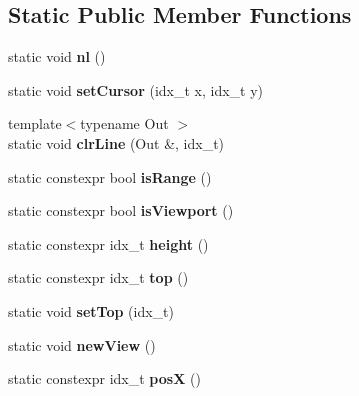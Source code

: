 \subsection*{Static Public Member Functions}
\begin{DoxyCompactItemize}
\item 
\mbox{\label{structVoid_ab9e55460d62efcdee74b1aa4d9f072d8}} 
static void {\bfseries nl} ()
\item 
\mbox{\label{structVoid_a8d6a91a1230fe7a7edccc976f9411fff}} 
static void {\bfseries set\+Cursor} (idx\+\_\+t x, idx\+\_\+t y)
\item 
\mbox{\label{structVoid_aec6ec1461767fd397b1eca2ff2426e85}} 
{\footnotesize template$<$typename Out $>$ }\\static void {\bfseries clr\+Line} (Out \&, idx\+\_\+t)
\item 
\mbox{\label{structVoid_a66533415aff9f27f42fd4875e35d214a}} 
static constexpr bool {\bfseries is\+Range} ()
\item 
\mbox{\label{structVoid_a506e78d763fd98f46b3eebb32a41abf8}} 
static constexpr bool {\bfseries is\+Viewport} ()
\item 
\mbox{\label{structVoid_a35178c61ada806fc21852fb42f6d144b}} 
static constexpr idx\+\_\+t {\bfseries height} ()
\item 
\mbox{\label{structVoid_a989fbac69b21af91ef9cf7362b0a916a}} 
static constexpr idx\+\_\+t {\bfseries top} ()
\item 
\mbox{\label{structVoid_a4452884311728e65148df7b814344bb8}} 
static void {\bfseries set\+Top} (idx\+\_\+t)
\item 
\mbox{\label{structVoid_a24bce8132e0d1f053d880a0c07272be9}} 
static void {\bfseries new\+View} ()
\item 
\mbox{\label{structVoid_a82727265a4c3a8d9dc66f75419b6cc55}} 
static constexpr idx\+\_\+t {\bfseries posX} ()
\item 
\mbox{\label{structVoid_a1451b93394f38a4535933459f616a904}} 

\end{DoxyCompactItemize}
